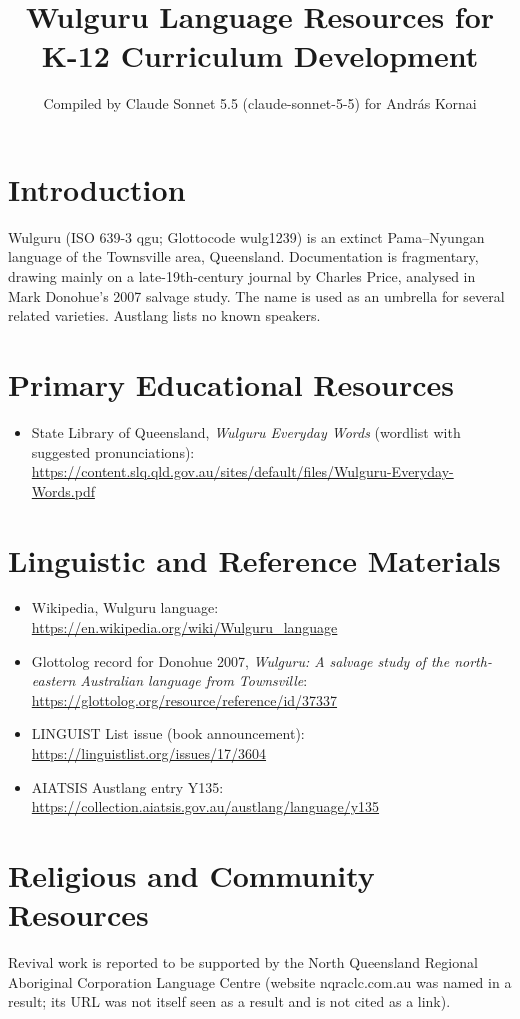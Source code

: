 \documentclass[12pt]{article}
\title{Wulguru Language Resources for K-12 Curriculum Development}
\author{Compiled by Claude Sonnet 5.5 (claude-sonnet-5-5) for Andr\'as Kornai}
\date{}
\begin{document}
\maketitle

\section{Introduction}
Wulguru (ISO 639-3 qgu; Glottocode wulg1239) is an extinct Pama--Nyungan language of the Townsville area, Queensland. Documentation is fragmentary, drawing mainly on a late-19th-century journal by Charles Price, analysed in Mark Donohue's 2007 salvage study. The name is used as an umbrella for several related varieties. Austlang lists no known speakers.

\section{Primary Educational Resources}
\begin{itemize}
\item State Library of Queensland, \emph{Wulguru Everyday Words} (wordlist with suggested pronunciations): \url{https://content.slq.qld.gov.au/sites/default/files/Wulguru-Everyday-Words.pdf}
\end{itemize}

\section{Linguistic and Reference Materials}
\begin{itemize}
\item Wikipedia, Wulguru language: \url{https://en.wikipedia.org/wiki/Wulguru_language}
\item Glottolog record for Donohue 2007, \emph{Wulguru: A salvage study of the north-eastern Australian language from Townsville}: \url{https://glottolog.org/resource/reference/id/37337}
\item LINGUIST List issue (book announcement): \url{https://linguistlist.org/issues/17/3604}
\item AIATSIS Austlang entry Y135: \url{https://collection.aiatsis.gov.au/austlang/language/y135}
\end{itemize}

\section{Religious and Community Resources}
Revival work is reported to be supported by the North Queensland Regional Aboriginal Corporation Language Centre (website nqraclc.com.au was named in a result; its URL was not itself seen as a result and is not cited as a link).
\end{document}
